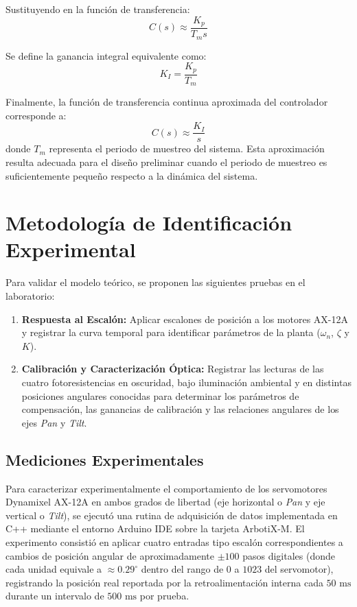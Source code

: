 \documentclass[12pt,a4paper]{article}
\begin{document}
Sustituyendo en la función de transferencia:
\begin{equation}
C(s) \approx \frac{K_p}{T_m s}
\end{equation}

Se define la ganancia integral equivalente como:
\begin{equation}
\boxed{K_I = \frac{K_p}{T_m}}
\end{equation}

Finalmente, la función de transferencia continua aproximada del controlador corresponde a:
\begin{equation}
\boxed{C(s) \approx \frac{K_I}{s}}
\end{equation}
donde $T_m$ representa el periodo de muestreo del sistema. Esta aproximación resulta adecuada para el diseño preliminar cuando el periodo de muestreo es suficientemente pequeño respecto a la dinámica del sistema.

\section{Metodología de Identificación Experimental}
Para validar el modelo teórico, se proponen las siguientes pruebas en el laboratorio:
\begin{enumerate}
    \item \textbf{Respuesta al Escalón:} Aplicar escalones de posición a los motores AX-12A y registrar la curva temporal para identificar parámetros de la planta ($\omega_n$, $\zeta$ y $K$).
    \item \textbf{Calibración y Caracterización Óptica:} Registrar las lecturas de las cuatro fotoresistencias en oscuridad, bajo iluminación ambiental y en distintas posiciones angulares conocidas para determinar los parámetros de compensación, las ganancias de calibración y las relaciones angulares de los ejes \emph{Pan} y \emph{Tilt}.
\end{enumerate}

\subsection{Mediciones Experimentales}

Para caracterizar experimentalmente el comportamiento de los servomotores Dynamixel AX-12A en ambos grados de libertad (eje horizontal o \emph{Pan} y eje vertical o \emph{Tilt}), se ejecutó una rutina de adquisición de datos implementada en C++ mediante el entorno Arduino IDE sobre la tarjeta ArbotiX-M. El experimento consistió en aplicar cuatro entradas tipo escalón correspondientes a cambios de posición angular de aproximadamente $\pm 100$ pasos digitales (donde cada unidad equivale a $\approx 0.29^\circ$ dentro del rango de $0$ a $1023$ del servomotor), registrando la posición real reportada por la retroalimentación interna cada $50\text{ ms}$ durante un intervalo de $500\text{ ms}$ por prueba.
\end{document}
